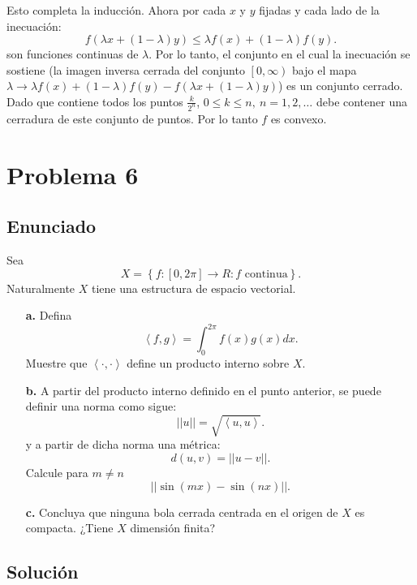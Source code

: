 \documentclass{report}
\begin{document}
\begin{enumerate}
  Esto completa la inducción.
  Ahora por cada $x$ y $y$ fijadas  y cada lado de la inecuación: \[
  f\left( \lambda x + \left( 1 - \lambda \right) y \right) \le \lambda f\left( x \right) + \left( 1 - \lambda \right) f\left( y \right) 
  .\] son funciones continuas de $\lambda$. Por lo tanto,  el conjunto en el cual la inecuación se sostiene (la imagen inversa cerrada del conjunto $\left[ 0, \infty \right) $ bajo el mapa $\lambda \to \lambda f\left( x \right) + \left( 1 - \lambda \right) f\left( y \right) - f\left( \lambda x + \left( 1 - \lambda \right) y\right) $) es un conjunto cerrado. Dado que contiene todos los puntos $\frac{k}{2^{n}}$, $0 \le k \le n,\ n = 1,2,\ldots$ debe contener una cerradura de este conjunto de puntos. Por lo tanto $f$ es convexo.
\end{enumerate}

\chapter{Problema 6}
\section{Enunciado}

Sea \[
X = \left\{ f:\left[ 0, 2\pi \right] \to R: \text{$f$ continua} \right\} 
.\] Naturalmente $X$ tiene una estructura de espacio vectorial.
\begin{enumerate}
  \item[\textbf{a.}] Defina \[
      \left<f, g \right> = \int_0^{2\pi}f\left( x \right) g\left( x \right) dx	
    .\] Muestre que $\left< \cdot, \cdot\right>$ define un producto interno sobre $X$.
  \item[\textbf{b.}] A partir del producto interno definido en el punto anterior, se puede definir una norma como sigue: \[
      \left| \left| u \right|  \right|  = \sqrt{\left<u, u \right>} 
      .\] y a partir de dicha norma una métrica: \[
      d(u, v) =  \left| \left| u - v \right|  \right| 
      .\] Calcule para $m \neq n$ \[
      \left| \left| \sin\left( mx \right) - \sin\left( nx \right)  \right|  \right| 
    .\] 
  \item[\textbf{c.}] Concluya que ninguna bola cerrada centrada en el origen de $X$ es compacta. ¿Tiene $X$ dimensión finita?
\end{enumerate}
\section{Solución}
\end{document}
